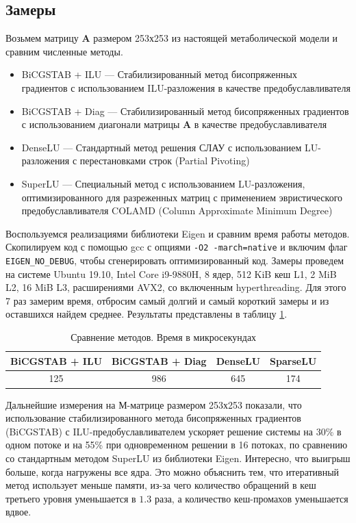 \documentclass[14pt, a4paper]{extreport}
\begin{document}
\subsection{Замеры}
Возьмем матрицу $\mathbf{A}$ размером 253х253 из настоящей метаболической модели и сравним численные методы. 
\begin{itemize}
	\item BiCGSTAB + ILU --- Стабилизированный метод бисопряженных\\градиентов\cite{BiCGSTAB} с использованием ILU-разложения в качестве предобуславливателя
	\item BiCGSTAB + Diag --- Стабилизированный метод бисопряженных градиентов с использованием диагонали матрицы $\mathbf{A}$ в качестве предобуславливателя
	\item DenseLU --- Стандартный метод решения СЛАУ с использованием LU-разложения с перестановками строк (Partial Pivoting)
	\item SuperLU --- Специальный метод с использованием LU-разложения, оптимизированного для разреженных матриц\cite{SuperLU} с применением эвристического предобуславливателя COLAMD (Column Approximate Minimum Degree)\cite{COLAMD}
\end{itemize}
Воспользуемся реализациями библиотеки Eigen и сравним время работы методов. Скопилируем код с помощью gcc с опциями \texttt{-O2 -march=native} и включим флаг \texttt{EIGEN\_NO\_DEBUG}, чтобы сгенерировать оптимизированный код. Замеры проведем на системе Ubuntu 19.10, Intel Core i9-9880H, 8 ядер, 512 KiB кеш L1, 2 MiB L2, 16 MiB L3, расширениями AVX2, со включенным hyperthreading. Для этого 7 раз замерим время, отбросим самый долгий и самый короткий замеры и из оставшихся найдем среднее. Результаты представлены в таблицу \ref{methods_benchmark}.

\begin{table}[b]
	\centering
	\caption{Сравнение методов. Время в микросекундах\label{methods_benchmark}}
	\begin{tabular}{c|c|c|c}
		\hline
		BiCGSTAB + ILU & BiCGSTAB + Diag & DenseLU & SparseLU\\
		\hline
		125 & 986 & 645 & 174\\
	\end{tabular}
\end{table}

Дальнейшие измерения на М-матрице размером 253х253 показали, что использование стабилизированного метода бисопряженных градиентов\\(BiCGSTAB) с ILU-предобуславливателем ускоряет решение системы на 30\% в одном потоке и на 55\% при одновременном решении в 16 потоках, по сравнению со стандартным методом SuperLU из библиотеки Eigen. Интересно, что выигрыш больше, когда нагружены все ядра. Это можно объяснить тем, что итеративный метод использует меньше памяти, из-за чего количество обращений в кеш третьего уровня уменьшается в $1.3$ раза, а количество кеш-промахов уменьшается вдвое. 
\end{document}
